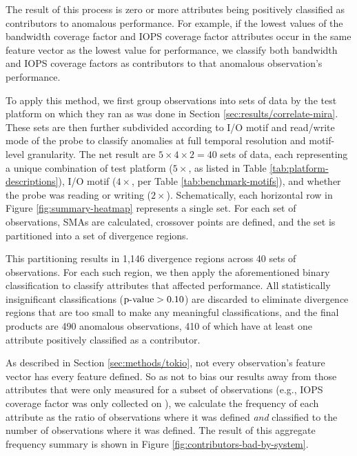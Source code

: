 The result of this process is zero or more attributes being positively classified as contributors to anomalous performance.
For example, if the lowest values of the bandwidth coverage factor and IOPS coverage factor attributes occur in the same feature vector as the lowest value for performance, we classify both bandwidth and IOPS coverage factors as contributors to that anomalous observation's performance.

To apply this method, we first group observations into sets of data by the test platform on which they ran as was done in Section \ref{sec:results/correlate-mira}.
These sets are then further subdivided according to I/O motif and read/write mode of the probe to classify anomalies at full temporal resolution and motif-level granularity.
The net result are $5 \times 4 \times 2 = 40$ sets of data, each representing a unique combination of test platform ($5 \times$, as listed in Table \ref{tab:platform-descriptions}), I/O motif ($4 \times$, per Table \ref{tab:benchmark-motifs}), and whether the probe was reading or writing ($2 \times$).
Schematically, each horizontal row in Figure \ref{fig:summary-heatmap} represents a single set.
For each set of observations, SMAs are calculated, crossover points are defined, and the set is partitioned into a set of divergence regions.

This partitioning results in 1,146 divergence regions across 40 sets of observations.
For each such region, we then apply the aforementioned binary classification to classify attributes that affected performance.
All statistically insignificant classifications ($\textup{p-value} > 0.10$) are discarded to eliminate divergence regions that are too small to make any meaningful classifications, and the final products are 
490 anomalous observations, 410 of which have at least one attribute positively classified as a contributor.

As described in Section \ref{sec:methods/tokio}, not every observation's feature vector has every feature defined.
So as not to bias our results away from those attributes that were only measured for a subset of observations (e.g., IOPS coverage factor was only collected on \mira), we calculate the frequency of each attribute as the ratio of observations where it was defined \emph{and} classified to the number of observations where it was defined.
The result of this aggregate frequency summary is shown in Figure \ref{fig:contributors-bad-by-system}.

